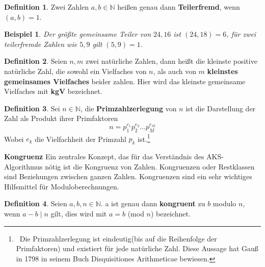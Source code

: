 \documentclass[12pt,oneside]{article}
\newtheorem{example}[theorem]{Beispiel}
\theoremstyle{remark}
\theoremstyle{definition}
\newtheorem{definition}{Definition}[section]
\begin{document}
\smallskip

\begin{definition}\label{Df_2}
Zwei Zahlen $a,b \in \mathbb{N}$ heißen genau dann \textbf{Teilerfremd}, wenn $(a,b) = 1$.
\end{definition}

\begin{example}
Der größte gemeinsame Teiler von $24,16$ ist $(24,18) = 6$, für zwei teilerfremde Zahlen wie $5,9$ gilt $(5,9) = 1$. 
\end{example}

\smallskip 



\smallskip

\begin{definition}
Seien $n, m$ zwei natürliche Zahlen, dann heißt die kleinste positive natürliche Zahl, die sowohl ein Vielfaches von $n$, als auch von $m$ \textbf{kleinstes gemeinsames Vielfaches} beider zahlen. Hier wird das kleinste gemeinsame Vielfaches mit \textbf{kgV} bezeichnet.
\end{definition}

\smallskip

\begin{definition}\label{Df_5}
Sei $n \in \mathbb{N}$, die \textbf{Primzahlzerlegung} von $n$ ist die Darstellung der Zahl als Produkt ihrer Primfaktoren \newline
\begin{equation}
    n = p_{1}^{e_{1}}p_{2}^{e_{2}}...p_{M}^{e_{M}}
\end{equation}
Wobei $e_{k}$ die Vielfachheit der Primzahl $p_{k}$ ist.\footnote{$\,$ Die Primzahlzerlegung ist eindeutig(bis auf die Reihenfolge der Primfaktoren) und existiert für jede natürliche Zahl. Diese Aussage hat Gauß in 1798 in seinem Buch Disquisitiones Arithmeticae bewiesen.\cite{gau-book}}
\end{definition}

\textbf{Kongruenz}\newline
Ein zentrales Konzept, das für das Verständnis des AKS-Algorithmus nötig ist die Kongruenz von Zahlen. Kongruenzen oder Restklassen sind Beziehungen zwischen ganzen Zahlen. Kongruenzen sind ein sehr wichtiges Hilfsmittel für Moduloberechnungen. 

\begin{definition}\label{Df_3}
Seien $a, b, n \in \mathbb{N}$. a ist genau dann \textbf{kongruent} zu $b$ modulo $n$, wenn $a - b \mid n$ gilt, dies wird mit $a = b$ (mod $n$) bezeichnet.  
\end{definition}
\end{document}
